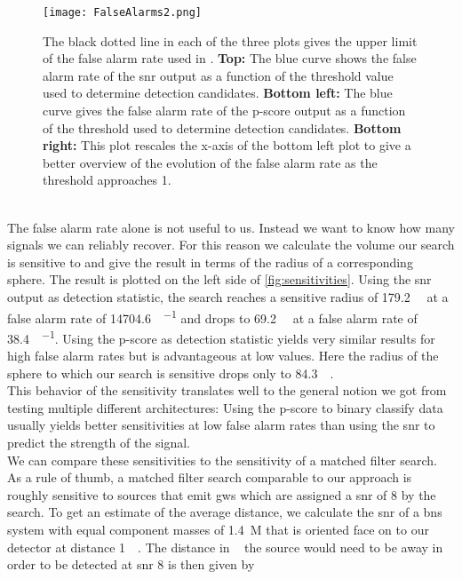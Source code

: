 \begin{figure}
\centering
\texttt{[image: FalseAlarms2.png]}
\caption[False alarm rates of single outputs]{The black dotted line in each of the three plots gives the upper limit of the false alarm rate used in \cite{bns_network}. \textbf{Top:} The blue curve shows the false alarm rate of the \gls{snr} output as a function of the threshold value used to determine detection candidates. \textbf{Bottom left:} The blue curve gives the false alarm rate of the p-score output as a function of the threshold used to determine detection candidates. \textbf{Bottom right:} This plot rescales the x-axis of the bottom left plot to give a better overview of the evolution of the false alarm rate as the threshold approaches 1.}\label{fig:false_alarm_rates}
\end{figure}\medskip\\
The false alarm rate alone is not useful to us. Instead we want to know how many signals we can reliably recover. For this reason we calculate the volume our search is sensitive to and give the result in terms of the radius of a corresponding sphere. The result is plotted on the left side of \autoref{fig:sensitivities}. Using the \gls{snr} output as detection statistic, the search reaches a sensitive radius of \SI{179.2}{\mega\parsec} at a false alarm rate of \SI[per-mode=fraction]{14704.6}{\samples\per\month} and drops to \SI{69.2}{\mega\parsec} at a false alarm rate of \SI[per-mode=fraction]{38.4}{\samples\per\month}. Using the p-score as detection statistic yields very similar results for high false alarm rates but is advantageous at low values. Here the radius of the sphere to which our search is sensitive drops only to \SI{84.3}{\mega\parsec}.\\
This behavior of the sensitivity translates well to the general notion we got from testing multiple different architectures: Using the p-score to binary classify data usually yields better sensitivities at low false alarm rates than using the \gls{snr} to predict the strength of the signal.\\
We can compare these sensitivities to the sensitivity of a matched filter search. As a rule of thumb, a matched filter search comparable to our approach is roughly sensitive to sources that emit \gls{gw}s which are assigned a \gls{snr} of 8 by the search. To get an estimate of the average distance, we calculate the \gls{snr} of a \gls{bns} system with equal component masses of \SI{1.4}{M_\odot} that is oriented face on to our detector at distance \SI{1}{\mega\parsec}. The distance in \si{\mega\parsec} the source would need to be away in order to be detected at \gls{snr} 8 is then given by
